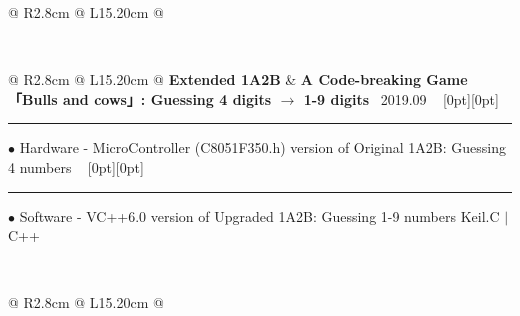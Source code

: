 {{\begin{tabularx}{\linewidth}{@{} R{2.8cm} @{\phantom{d}} L{15.20cm} @{}}
\end{tabularx}
\\
\begin{tabularx}{\linewidth}{@{} R{2.8cm} @{\phantom{d}} L{15.20cm} @{}}
	\textbf{Extended 1A2B} & \hspace{9pt} \textbf{A Code-breaking Game「Bulls and cows」: Guessing 4 digits $\to$ 1-9 digits} \hfill \textendash\ 2019.09 \newline \vspace{2pt} \ \hspace{-3pt} \raisebox{0.09\height}[0pt][0pt]{\vrule width0.5pt height30.0pt} \hspace{-0.30em}\rule[0.25em]{1.0em}{0.5pt}\!\! $\bullet$ {\small Hardware - MicroController (C8051F350.h) version of Original 1A2B: Guessing 4 numbers} \newline \vspace{-3pt} \ \hspace{-3pt} \raisebox{0.18\height}[0pt][0pt]{\vrule width0.5pt height14.5pt} \hspace{-0.30em}\rule[0.25em]{1.0em}{0.5pt}\!\! $\bullet$ {\small Software - VC++6.0 version of Upgraded 1A2B: Guessing 1-9 numbers} \hfill {\small \color{color-detail} Keil.C $|$ C++} \href{https://youtu.be/BiX5CQXVdPY}{\raisebox{-0.05\height}{\color{youtube_red!50}\faYoutube}} \href{https://github.com/ChenZhu-Xie/1A2B_3C_4A5B}{\color{black!50}\faGithub} \\ \Gap\Gap\Gap
\end{tabularx}
\\
\begin{tabularx}{\linewidth}{@{} R{2.8cm} @{\phantom{d}} L{15.20cm} @{}}

\end{tabularx}}}
